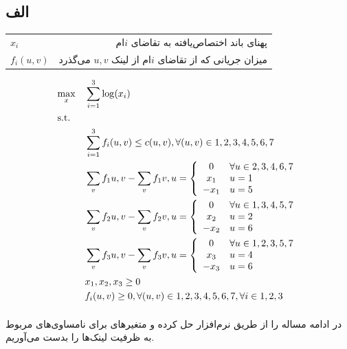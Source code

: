 \documentclass[paper=a4, fontsize=11pt]{article}
\numberwithin{equation}{section} %
\numberwithin{figure}{section} %
\numberwithin{table}{section} %
\begin{document}
\subsection{الف}
\begin{tabular}{l r}
	\(x_i\) & پهنای باند اختصاص‌یافته به تقاضای \(i\)ام\\
	\(f_i(u, v)\) & میزان جریانی که از تقاضای \(i\)ام از لینک \(u, v\) می‌گذرد\\
\end{tabular}
\begin{equation}
	\begin{aligned}
		& \underset{x}{\text{max}}
		& & \sum_{i=1}^{3} \log(x_i) \\
		& \text{s.t.} \\
		& & & \sum_{i=1}^{3} f_i(u, v) \le c(u, v), \forall (u, v) \in {1, 2, 3, 4, 5, 6, 7} \\
		& & & \sum_{v} f_1{u, v} - \sum_{v} f_1{v, u} = \left\{ \begin{array}{c l}
			0 & \forall u \in {2, 3, 4, 6, 7}\\
			x_1 & u = 1\\
			-x_1 & u = 5\\
		\end{array} \right.\\
		& & & \sum_{v} f_2{u, v} - \sum_{v} f_2{v, u} = \left\{ \begin{array}{c l}
			0 & \forall u \in {1, 3, 4, 5, 7}\\
			x_2 & u = 2\\
			-x_2 & u = 6\\
		\end{array} \right.\\
		& & & \sum_{v} f_3{u, v} - \sum_{v} f_3{v, u} = \left\{ \begin{array}{c l}
			0 & \forall u \in {1, 2, 3, 5, 7}\\
			x_3 & u = 4\\
			-x_3 & u = 6\\
		\end{array} \right.\\
		& & & x_1, x_2, x_3 \ge 0 \\
		& & & f_i(u, v) \ge 0, \forall (u, v) \in {1, 2, 3, 4, 5, 6, 7}, \forall i \in {1, 2, 3}
	\end{aligned}
\end{equation}

\paragraph{}
در ادامه مساله را از طریق نرم‌افزار  حل کرده
و متغیرهای  برای نامساوی‌های مربوط به ظرفیت
لینک‌ها را بدست می‌آوریم.
\end{document}
